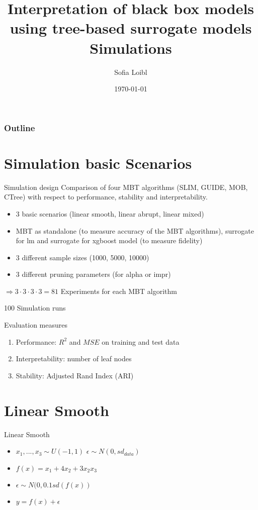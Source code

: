 \documentclass[9pt, xcolor=table]{beamer}
\title[Interpretation of black box models]{Interpretation of black box models using tree-based surrogate models \newline \small{Simulations}}
\author[Sofia Loibl]{Sofia Loibl}
\institute[LMU]{LMU München}
\date{\today}
\begin{document}
\begin{frame}
\titlepage 
\end{frame}


\begin{frame}
\frametitle{Outline} 
\tableofcontents 
\end{frame}


\section{Simulation basic Scenarios}
\begin{frame}{Simulation design}
Comparison of four MBT algorithms (SLIM, GUIDE, MOB, CTree)
with respect to performance, stability and interpretability.

\vspace{0.3cm}
\begin{itemize}
    \item 3 basic scenarios (linear smooth, linear abrupt, linear mixed)
    \item MBT as standalone (to measure accuracy of the MBT algorithms), surrogate for lm and surrogate for xgboost model (to measure fidelity)
    \item 3 different sample sizes (1000, 5000, 10000)
    \item 3 different pruning parameters (for alpha or impr)\end{itemize}
    
$\Rightarrow 3 \cdot 3 \cdot 3 \cdot 3 = 81$ Experiments for each MBT algorithm

\vspace{0.3cm}
100 Simulation runs

    
\end{frame}

\begin{frame}{Evaluation measures}
\begin{enumerate}
    \item Performance: $R^2$ and $MSE$ on training and test data
    \item Interpretability: number of leaf nodes
    \item Stability: Adjusted Rand Index (ARI)
\end{enumerate}
    
\end{frame}

\section{Linear Smooth}
\begin{frame}{Linear Smooth}
\begin{itemize}
    \item $x_1,..., x_3 \sim U(-1,1)$ $\epsilon \sim N(0, sd_{data})$
    \item $ f(x) = x_1 + 4   x_2 + 3   x_2   x_3 $
    \item $\epsilon \sim N(0, 0.1 sd(f(x))$
    \item $y = f(x) + \epsilon$
\end{itemize}

\end{frame}
\end{document}
